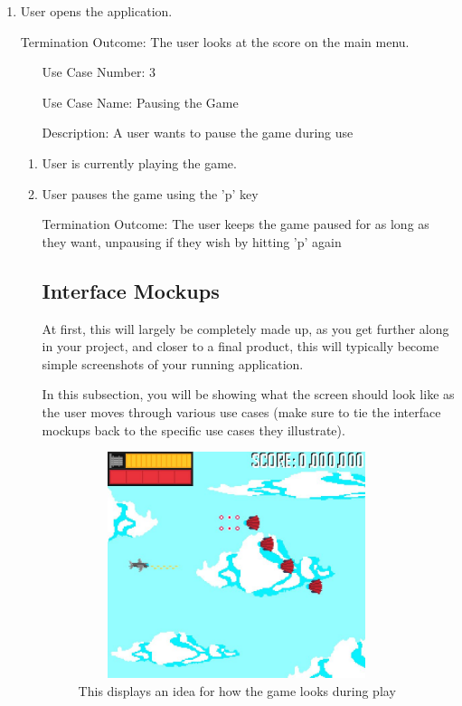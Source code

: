 \documentclass[10pt,conference,onecolumn,compsoc]{IEEEtran}
\begin{document}
\begin{enumerate}
\item User opens the application.
\item[Termination Outcome:] The user looks at the score on the main menu.

\begin{itemize}
\item[Use Case Number:] 3
\item[Use Case Name:] Pausing the Game
\item[Description:] A user wants to pause the game during use
\end{itemize}

\begin{enumerate}
\item User is currently playing the game.
\item User pauses the game using the 'p' key
\item[Termination Outcome:] The user keeps the game paused for as long as they want, unpausing if they wish by hitting 'p' again



\subsection{Interface Mockups}
At first, this will largely be completely made up, as you get further along in your project, and closer to a final product, this will typically become simple screenshots of your running application.

In this subsection, you will be showing what the screen should look like as the user moves through various use cases (make sure to tie the interface mockups back to the specific use cases they illustrate).

\begin{figure}[ht!]
\includegraphics[height=250px, width=350px]{Spitfire_91MockUp.jpg}
\caption{This displays an idea for how the game looks during play}
\label{cat1}
\end{figure}



\end{enumerate}
\end{enumerate}
\end{document}
